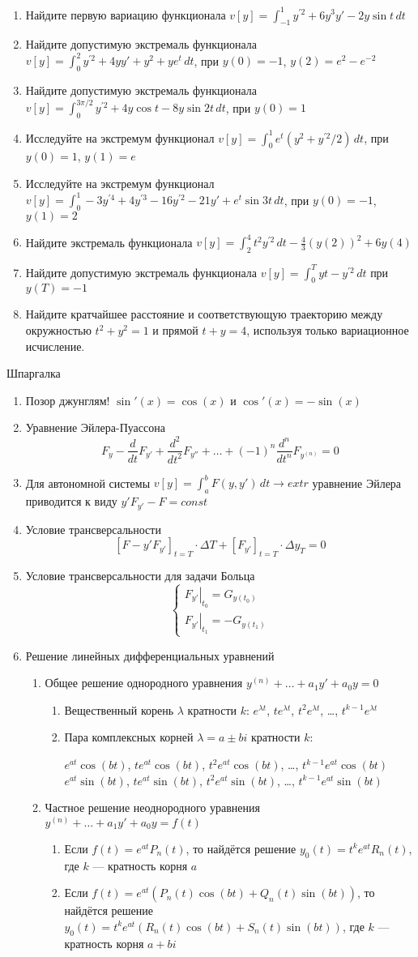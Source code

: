 \documentclass[pdftex,12pt,a4paper]{article}
\newcommand{\shpargalka}{Шпаргалка

\begin{enumerate}
\item Позор джунглям! $\sin'(x)=\cos(x)$ и $\cos'(x)=-\sin(x)$

\item Уравнение Эйлера-Пуассона
\[
F_y-\frac{d}{dt}F_{y'}+\frac{d^2}{dt^2}F_{y''}+\ldots+(-1)^n\frac{d^n}{dt^n}F_{y^{(n)}}=0
\]

\item Для автономной системы $v[y]=\int_a^b F(y,y')\, dt \to extr$ уравнение Эйлера приводится к виду $y'F_{y'}-F=const$

\item Условие трансверсальности 
\[
[F-y'F_{y'}]_{t=T}\cdot \Delta T + [F_{y'}]_{t=T}\cdot \Delta y_T=0
\]

\item Условие трансверсальности для задачи Больца
\[
\begin{cases}
\left. F_{y'}\right|_{t_0}=G_{y(t_0)} \\
\left. F_{y'}\right|_{t_1}=-G_{y(t_1)}
\end{cases}
\]

\item Решение линейных дифференциальных уравнений

\begin{enumerate}
\item Общее решение однородного уравнения $y^{(n)}+\ldots+a_1 y'+a_0 y=0$
\begin{enumerate}
\item Вещественный корень $\lambda$ кратности $k$: $e^{\lambda t}$, $te^{\lambda t}$, $t^2e^{\lambda t}$, \ldots, $t^{k-1}e^{\lambda t}$
\item Пара комплексных корней $\lambda=a\pm bi$  кратности $k$:

$e^{at}\cos(bt)$, $te^{at}\cos(bt)$, $t^2e^{at}\cos(bt)$, \ldots, $t^{k-1}e^{at}\cos(bt)$ \\
$e^{at}\sin(bt)$, $te^{at}\sin(bt)$, $t^2e^{at}\sin(bt)$, \ldots, $t^{k-1}e^{at}\sin(bt)$
\end{enumerate}
\item Частное решение неоднородного уравнения $y^{(n)}+\ldots+a_1 y'+a_0 y=f(t)$
\begin{enumerate}
\item Если $f(t)=e^{at}P_n(t)$, то найдётся решение $y_0(t)=t^k e^{at} R_n(t)$, где $k$ --- кратность корня $a$
\item Если $f(t)=e^{at}(P_n(t)\cos(bt)+Q_n(t)\sin(bt))$, то найдётся решение \\
$y_0(t)=t^k e^{at}(R_n(t)\cos(bt)+S_n(t)\sin(bt))$, где $k$ --- кратность корня $a+bi$
\end{enumerate}
\end{enumerate}

\end{enumerate}
}
\begin{document}
\begin{enumerate}
\item Найдите первую вариацию функционала $v[y]=\int_{-1}^1 y^{\prime 2} +6y^3 y'-2y\sin t \, dt$
\item Найдите допустимую экстремаль функционала
$v[y]=\int_0^2 y^{\prime 2} +4yy'+y^2+ye^{t} \, dt$, при $y(0)=-1$, $y(2)=e^2-e^{-2}$

\item Найдите допустимую экстремаль функционала
$v[y]=\int_0^{3\pi/2} y^{\prime 2} +4y\cos t -8y\sin 2t \, dt$, при $y(0)=1$

\item Исследуйте на экстремум функционал $v[y]=\int_0^1 e^t \left(y^2+y^{\prime 2}/2 \right) \, dt$, при $y(0)=1$, $y(1)=e$

\item Исследуйте на экстремум функционал $v[y]=\int_0^1 -3y^{\prime 4} +4y^{\prime 3}-16y^{\prime 2}-21y'+e^t \sin 3t \, dt$, при $y(0)=-1$, $y(1)=2$

\item Найдите экстремаль функционала $v[y]=\int_2^4 t^2 y^{\prime 2} \, dt-\frac{4}{3}(y(2))^2+6y(4)$

\item Найдите допустимую экстремаль функционала $v[y]=\int_0^T yt-y^{\prime 2} \, dt$ при $y(T)=-1$

\item Найдите кратчайшее расстояние и соответствующую траекторию между окружностью $t^2+y^2=1$ и прямой $t+y=4$, используя только вариационное исчисление.

\end{enumerate}

\vspace{40pt}

\shpargalka
\end{document}
